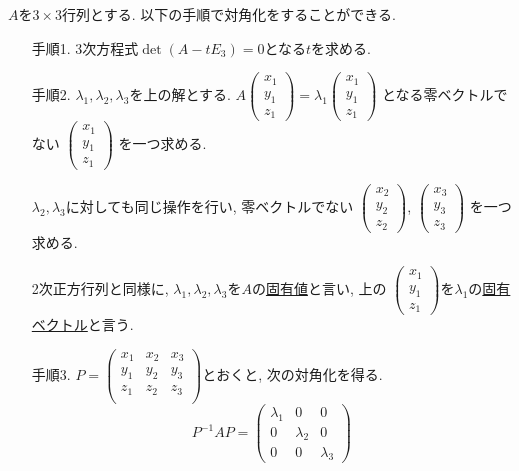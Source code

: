 \documentclass[dvipdfmx,a4paper,11pt]{article}
\theoremstyle{definition}
\begin{document}
  \begin{tcolorbox}[
    colback = white,
    colframe = green!35!black,
    fonttitle = \bfseries,
    breakable = true]    
$A$を$3 \times 3$行列とする. 以下の手順で対角化をすることができる. 
\begin{enumerate}
	\setlength{\parskip}{0cm}
  	\setlength{\itemsep}{0pt} 
\item[手順1.] 3次方程式$\det (A - tE_3) =0$となる$t$を求める. 
\item[手順2.] $\lambda_1, \lambda_2, \lambda_3$を上の解とする. 
$
A\begin{pmatrix}
x_1\\  y_1\\ z_1
 \end{pmatrix}  
 = 
 \lambda_1
 \begin{pmatrix}
x_1\\  y_1\\ z_1
 \end{pmatrix}  
$
となる零ベクトルでない
$ \begin{pmatrix}
x_1\\  y_1\\ z_1
 \end{pmatrix}  
 $
 を一つ求める.
 
 $\lambda_2, \lambda_3$に対しても同じ操作を行い, 零ベクトルでない
$ \begin{pmatrix}
x_2\\  y_2\\ z_2
 \end{pmatrix}  
 $, 
 $ \begin{pmatrix}
x_3\\  y_3\\ z_3
 \end{pmatrix}  
 $
 を一つ求める. 
 
 2次正方行列と同様に, $\lambda_1, \lambda_2, \lambda_3$を$A$の\underline{固有値}と言い, 上の
 $ \begin{pmatrix}
x_1 \\ y_1\\z_1
 \end{pmatrix}  
 $を$\lambda_1$の\underline{固有ベクトル}と言う.
 
\item[手順3.]  
$P=\begin{pmatrix}
x_1&x_2&x_3\\  
y_1&y_2&y_3\\ 
z_1&z_2&z_3\\
\end{pmatrix}$とおくと, 次の対角化を得る.
$$
P^{-1} A P=
\begin{pmatrix}
\lambda_1& 0 &0\\
0& \lambda_2 &0\\
0 & 0& \lambda_3
\end{pmatrix}
$$ 
\end{enumerate}
 \end{tcolorbox}
 
\end{document}
